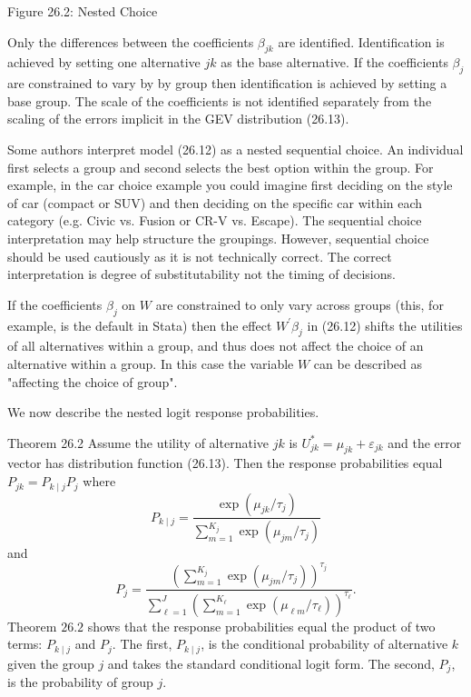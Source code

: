 \documentclass[10pt]{article}
\begin{document}
Figure 26.2: Nested Choice

Only the differences between the coefficients $\beta_{j k}$ are identified. Identification is achieved by setting one alternative $j k$ as the base alternative. If the coefficients $\beta_{j}$ are constrained to vary by by group then identification is achieved by setting a base group. The scale of the coefficients is not identified separately from the scaling of the errors implicit in the GEV distribution (26.13).

Some authors interpret model (26.12) as a nested sequential choice. An individual first selects a group and second selects the best option within the group. For example, in the car choice example you could imagine first deciding on the style of car (compact or SUV) and then deciding on the specific car within each category (e.g. Civic vs. Fusion or CR-V vs. Escape). The sequential choice interpretation may help structure the groupings. However, sequential choice should be used cautiously as it is not technically correct. The correct interpretation is degree of substitutability not the timing of decisions.

If the coefficients $\beta_{j}$ on $W$ are constrained to only vary across groups (this, for example, is the default in Stata) then the effect $W^{\prime} \beta_{j}$ in (26.12) shifts the utilities of all alternatives within a group, and thus does not affect the choice of an alternative within a group. In this case the variable $W$ can be described as "affecting the choice of group".

We now describe the nested logit response probabilities.

Theorem 26.2 Assume the utility of alternative $j k$ is $U_{j k}^{*}=\mu_{j k}+\varepsilon_{j k}$ and the error vector has distribution function (26.13). Then the response probabilities equal $P_{j k}=P_{k \mid j} P_{j}$ where
$$
P_{k \mid j}=\frac{\exp \left(\mu_{j k} / \tau_{j}\right)}{\sum_{m=1}^{K_{j}} \exp \left(\mu_{j m} / \tau_{j}\right)}
$$
and
$$
P_{j}=\frac{\left(\sum_{m=1}^{K_{j}} \exp \left(\mu_{j m} / \tau_{j}\right)\right)^{\tau_{j}}}{\sum_{\ell=1}^{J}\left(\sum_{m=1}^{K_{\ell}} \exp \left(\mu_{\ell m} / \tau_{\ell}\right)\right)^{\tau_{\ell}}} .
$$
Theorem $26.2$ shows that the response probabilities equal the product of two terms: $P_{k \mid j}$ and $P_{j}$. The first, $P_{k \mid j}$, is the conditional probability of alternative $k$ given the group $j$ and takes the standard conditional logit form. The second, $P_{j}$, is the probability of group $j$.
\end{document}
